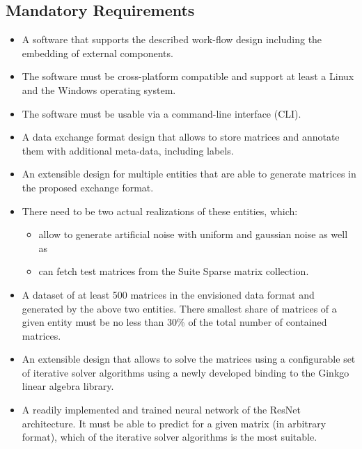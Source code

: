 \documentclass[parskip=full]{scrartcl}
\begin{document}
\subsection{Mandatory Requirements}
\begin{itemize}

\item A software that supports the described work-flow design including the embedding of external components.

\item The software must be cross-platform compatible and support at least a Linux and the Windows operating system.

\item The software must be usable via a command-line interface (CLI).

\item A data exchange format design that allows to store matrices and annotate them with 
additional meta-data, including labels.

\item An extensible design for multiple entities that are able to generate matrices in the proposed exchange format.

\item There need to be two actual realizations of these entities, which:

\begin{itemize}
    \item allow to generate artificial noise with uniform and gaussian noise as well as
    
    \item can fetch test matrices from the Suite Sparse matrix collection.
\end{itemize}

\item A dataset of at least 500 matrices in the envisioned data format and generated by the above two entities. There smallest share of matrices of a given entity must be no less than 30\% of the total number of contained matrices.

\item An extensible design that allows to solve the matrices using a configurable set of iterative solver algorithms using a newly developed binding to the Ginkgo linear algebra library.

\item A readily implemented and trained neural network of the ResNet architecture. It must be able to predict for a given matrix (in arbitrary format), which of the iterative solver algorithms is the most suitable.


\end{itemize}
\end{document}
